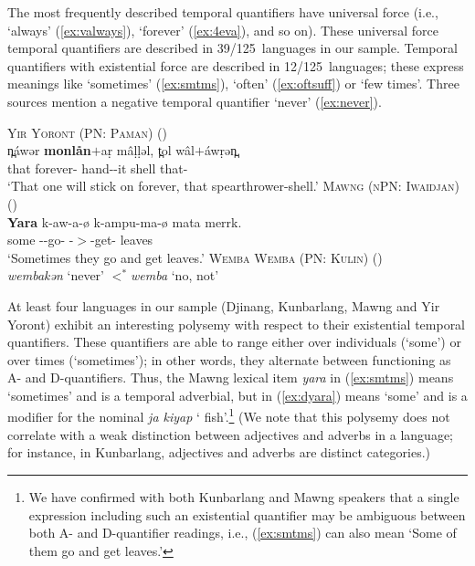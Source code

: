 \documentclass[12pt,egregdoesnotlikesansseriftitles]{scrartcl}
\newcommand{\ofy}{/125} %
\begin{document}
The most frequently described temporal quantifiers have universal force (i.e., `always' (\ref{ex:valways}), `forever' (\ref{ex:4eva}), and so on). These universal force temporal quantifiers are described in 39\ofy \ languages in our sample.%
Temporal quantifiers with existential force are described in 12\ofy \  languages; these express meanings like `sometimes' (\ref{ex:smtms}), `often' (\ref{ex:oftsuff}) or `few times'. Three sources mention a negative temporal quantifier `never' (\ref{ex:never}).
\begin{exe}
  \ex\label{ex:4eva} \textsc{Yir Yoront (PN: Paman)} \hfill (\citealt[343]{alpher73})\\
  \gll n̪\'awər \textbf{monlån}$+$a\d{r} m\^a\d{l}\d{l}əl, t̪ol w\^al$+$\'aw\d{r}ən̪.\\
  that forever-\Sel{} hand-\Np-it shell that-\Sub\\
  \glt `That one will stick on forever, that spearthrower-shell.'
  \ex\label{ex:smtms} \textsc{Mawng (nPN: Iwaidjan)} \hfill (\citealt{ngaralk})\\
  \gll \textbf{Yara} k-aw-a-ø k-ampu-ma-ø mata merrk.\\
  some \Prs-\Tpl-go-\Np{} \Prs-\Tpl$>$\Third\Clveg-get-\Np{} \Clveg{} leaves\\
  \glt `Sometimes they go and get leaves.' %
  \ex\label{ex:never} \textsc{Wemba Wemba (PN: Kulin)} \hfill (\citealt[47]{hercus92})\\
  \textit{\charis wembakən} `never' $<^*$\textit{wemba} `no, not'
\end{exe}

At least four languages in our sample (Djinang, Kunbarlang, Mawng and Yir Yoront) exhibit an interesting polysemy with respect to their existential temporal quantifiers. These quantifiers are able to range either over individuals (`some') or over times (`sometimes'); in other words, they alternate between functioning as A- and D-quantifiers.  Thus, the Mawng lexical item \textit{yara} in (\ref{ex:smtms}) means `sometimes' and is a temporal adverbial, but in (\ref{ex:dyara}) means `some' and is a modifier for the nominal \textit{ja kiyap} `\Clm{} fish'.\footnote{We have confirmed with both Kunbarlang and Mawng speakers that a single expression including such an existential quantifier may be ambiguous between both A- and D-quantifier readings, i.e., (\ref{ex:smtms}) can also mean `Some of them go and get leaves.'} (We note that this polysemy does not correlate with a weak distinction between adjectives and adverbs in a language; for instance, in Kunbarlang, adjectives and adverbs are distinct categories.)
\end{document}
